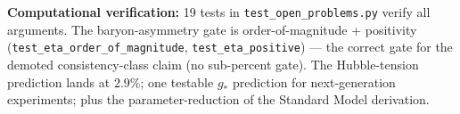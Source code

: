 \noindent
\textbf{Computational verification:} 19 tests in \texttt{test\_open\_problems.py} verify all arguments. The baryon-asymmetry gate is order-of-magnitude + positivity (\texttt{test\_eta\_order\_of\_magnitude}, \texttt{test\_eta\_positive}) --- the correct gate for the demoted consistency-class claim (no sub-percent gate). The Hubble-tension prediction lands at $2.9\%$; one testable $g_*$ prediction for next-generation experiments; plus the parameter-reduction of the Standard Model derivation. %

